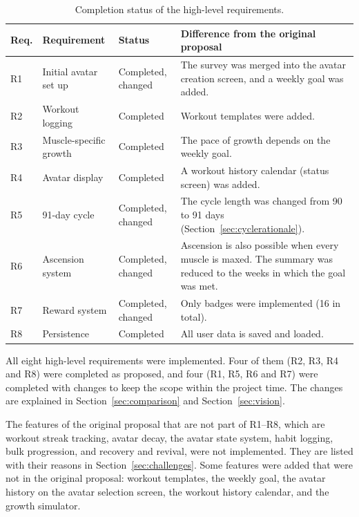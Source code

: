 \documentclass[11pt]{article}
\begin{document}
\begin{table}[h]
\centering
\renewcommand{\arraystretch}{1.3}
\begin{tabular}{|p{}|p{}|p{}|p{}|}
\hline
\textbf{Req.} & \textbf{Requirement} & \textbf{Status} & \textbf{Difference from the original proposal} \\ \hline
R1 & Initial avatar set up & Completed, changed & The survey was merged into the avatar creation screen, and a weekly goal was added. \\ \hline
R2 & Workout logging & Completed & Workout templates were added. \\ \hline
R3 & Muscle-specific growth & Completed & The pace of growth depends on the weekly goal. \\ \hline
R4 & Avatar display & Completed & A workout history calendar (status screen) was added. \\ \hline
R5 & 91-day cycle & Completed, changed & The cycle length was changed from 90 to 91 days (Section~\ref{sec:cyclerationale}). \\ \hline
R6 & Ascension system & Completed, changed & Ascension is also possible when every muscle is maxed. The summary was reduced to the weeks in which the goal was met. \\ \hline
R7 & Reward system & Completed, changed & Only badges were implemented (16 in total). \\ \hline
R8 & Persistence & Completed & All user data is saved and loaded. \\ \hline
\end{tabular}
\caption{Completion status of the high-level requirements.}
\label{tab:completion}
\end{table}

All eight high-level requirements were implemented. Four of them (R2, R3, R4 and R8) were completed as proposed, and four (R1, R5, R6 and R7) were completed with changes to keep the scope within the project time. The changes are explained in Section~\ref{sec:comparison} and Section~\ref{sec:vision}.

The features of the original proposal that are not part of R1--R8, which are workout streak tracking, avatar decay, the avatar state system, habit logging, bulk progression, and recovery and revival, were not implemented. They are listed with their reasons in Section~\ref{sec:challenges}. Some features were added that were not in the original proposal: workout templates, the weekly goal, the avatar history on the avatar selection screen, the workout history calendar, and the growth simulator.
\end{document}
